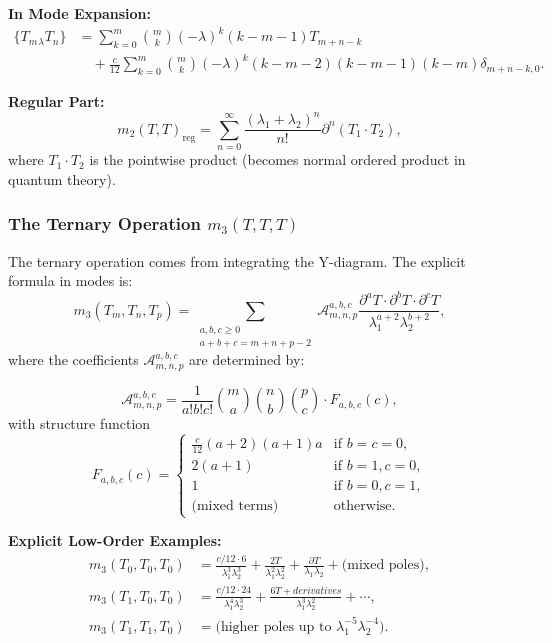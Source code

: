 \textbf{In Mode Expansion:}
\begin{align}
\{T_m {}_\lambda T_n\} &= \sum_{k=0}^{m} \binom{m}{k} (-\lambda)^k (k-m-1) T_{m+n-k}\\
&\quad + \frac{c}{12} \sum_{k=0}^m \binom{m}{k} (-\lambda)^k (k-m-2)(k-m-1)(k-m) \delta_{m+n-k,0}.
\end{align}

\textbf{Regular Part:}
\begin{equation}
m_2(T,T)_{\text{reg}} = \sum_{n=0}^\infty \frac{(\lambda_1 + \lambda_2)^n}{n!} \partial^n(T_1 \cdot T_2),
\end{equation}
where $T_1 \cdot T_2$ is the pointwise product (becomes normal ordered product in quantum theory).

\subsubsection{The Ternary Operation $m_3(T,T,T)$}

The ternary operation comes from integrating the Y-diagram. The explicit formula in modes is:
\begin{equation}
m_3(T_m, T_n, T_p) = \sum_{\substack{a,b,c \geq 0 \\ a+b+c = m+n+p-2}} \mathcal{A}_{m,n,p}^{a,b,c} \frac{\partial^a T \cdot \partial^b T \cdot \partial^c T}{\lambda_1^{a+2} \lambda_2^{b+2}},
\end{equation}
where the coefficients $\mathcal{A}_{m,n,p}^{a,b,c}$ are determined by:

\begin{equation}
\mathcal{A}_{m,n,p}^{a,b,c} = \frac{1}{a! b! c!} \binom{m}{a} \binom{n}{b} \binom{p}{c} \cdot F_{a,b,c}(c),
\end{equation}
with structure function
\begin{equation}
F_{a,b,c}(c) = \begin{cases}
\frac{c}{12}(a+2)(a+1)a & \text{if } b=c=0,\\
2(a+1) & \text{if } b=1, c=0,\\
1 & \text{if } b=0, c=1,\\
\text{(mixed terms)} & \text{otherwise}.
\end{cases}
\end{equation}

\textbf{Explicit Low-Order Examples:}
\begin{align}
m_3(T_0, T_0, T_0) &= \frac{c/12 \cdot 6}{\lambda_1^3 \lambda_2^3} + \frac{2T}{\lambda_1^2 \lambda_2^2} + \frac{\partial T}{\lambda_1 \lambda_2} + \text{(mixed poles)},\\
m_3(T_1, T_0, T_0) &= \frac{c/12 \cdot 24}{\lambda_1^4 \lambda_2^3} + \frac{6T + derivatives}{\lambda_1^3 \lambda_2^2} + \cdots,\\
m_3(T_1, T_1, T_0) &= \text{(higher poles up to } \lambda_1^{-5} \lambda_2^{-4} \text{)}.
\end{align}

